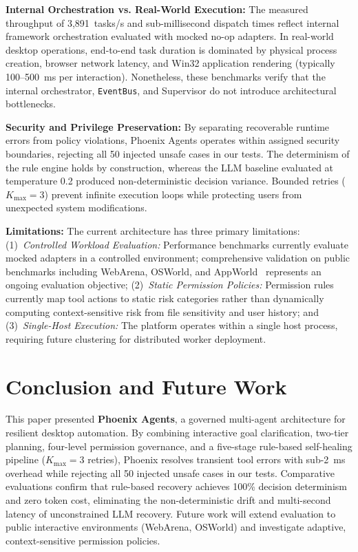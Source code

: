 \documentclass[conference]{IEEEtran}
\begin{document}
\textbf{Internal Orchestration vs. Real-World Execution:} The measured throughput of 3,891~tasks/s and sub-millisecond dispatch times reflect internal framework orchestration evaluated with mocked no-op adapters. In real-world desktop operations, end-to-end task duration is dominated by physical process creation, browser network latency, and Win32 application rendering (typically 100--500~ms per interaction). Nonetheless, these benchmarks verify that the internal orchestrator, \texttt{EventBus}, and Supervisor do not introduce architectural bottlenecks.

\textbf{Security and Privilege Preservation:} By separating recoverable runtime errors from policy violations, Phoenix Agents operates within assigned security boundaries, rejecting all 50 injected unsafe cases in our tests. The determinism of the rule engine holds by construction, whereas the LLM baseline evaluated at temperature 0.2 produced non-deterministic decision variance. Bounded retries ($K_{\text{max}}=3$) prevent infinite execution loops while protecting users from unexpected system modifications.

\textbf{Limitations:} The current architecture has three primary limitations: (1)~\textit{Controlled Workload Evaluation:} Performance benchmarks currently evaluate mocked adapters in a controlled environment; comprehensive validation on public benchmarks including WebArena, OSWorld, and AppWorld~\cite{zhou2023,xie2024,trivedi2024} represents an ongoing evaluation objective; (2)~\textit{Static Permission Policies:} Permission rules currently map tool actions to static risk categories rather than dynamically computing context-sensitive risk from file sensitivity and user history; and (3)~\textit{Single-Host Execution:} The platform operates within a single host process, requiring future clustering for distributed worker deployment.

\section{Conclusion and Future Work}

This paper presented \textbf{Phoenix Agents}, a governed multi-agent architecture for resilient desktop automation. By combining interactive goal clarification, two-tier planning, four-level permission governance, and a five-stage rule-based self-healing pipeline ($K_{\text{max}}=3$ retries), Phoenix resolves transient tool errors with sub-2~ms overhead while rejecting all 50 injected unsafe cases in our tests. Comparative evaluations confirm that rule-based recovery achieves 100\% decision determinism and zero token cost, eliminating the non-deterministic drift and multi-second latency of unconstrained LLM recovery. Future work will extend evaluation to public interactive environments (WebArena, OSWorld) and investigate adaptive, context-sensitive permission policies.
\end{document}
